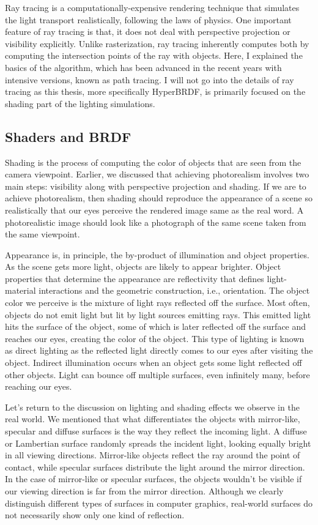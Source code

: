 Ray tracing is a computationally-expensive rendering technique that simulates the light transport realistically, following the laws of physics. One important feature of ray tracing is that, it does not deal with perspective projection or visibility explicitly. Unlike rasterization, ray tracing inherently computes both by computing the intersection points of the ray with objects. Here, I explained the basics of the algorithm, which has been advanced in the recent years with intensive versions, known as path tracing. I will not go into the details of ray tracing as this thesis, more specifically HyperBRDF, is primarily focused on the shading part of the lighting simulations.

\subsection{Shaders and BRDF}

Shading is the process of computing the color of objects that are seen from the camera viewpoint. Earlier, we discussed that achieving photorealism involves two main steps:  visibility along with perspective projection and shading. If we are to achieve photorealism, then shading should reproduce the appearance of a scene so realistically that our eyes perceive the rendered image same as  the real word. A photorealistic image should look like a photograph of the same scene taken from the same viewpoint. 

Appearance is, in principle, the by-product of illumination and object properties. As the scene gets more light, objects are likely to appear brighter. Object properties that determine the appearance are reflectivity that defines light-material interactions and the geometric construction, i.e., orientation. The object color we perceive is the mixture of light rays reflected off the surface. Most often, objects do not emit light but lit by light sources emitting rays. This emitted light hits the surface of the object, some of which is later reflected off the surface and reaches our eyes, creating the color of the object. This type of lighting is known as direct lighting as the reflected light directly comes to our eyes after visiting the object. Indirect illumination occurs when an object gets some light reflected off other objects. Light can bounce off multiple surfaces, even infinitely many, before reaching our eyes.

Let's return to the discussion on lighting and shading effects we observe in the real world. We mentioned that what differentiates the objects with mirror-like,  specular and diffuse surfaces is the way they reflect the incoming light. A diffuse or Lambertian surface randomly spreads the incident light, looking equally bright in all viewing directions. Mirror-like objects reflect the ray around the point of contact, while specular surfaces distribute the light around the mirror direction. In the case of mirror-like or specular surfaces, the objects wouldn't be visible if our viewing direction is far from the mirror direction. Although we clearly distinguish different types of surfaces in computer graphics, real-world surfaces do not necessarily show only one kind of reflection.


